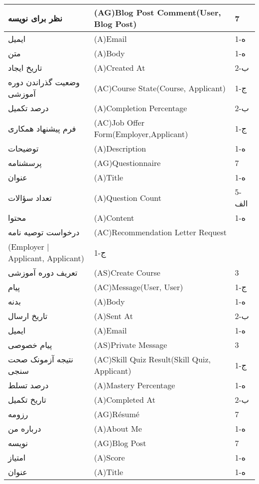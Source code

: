 \documentclass[12pt]{article}
\begin{document}
\begin{longtable}{|l|l|l|}
		\hline
		نظر برای نویسه & (AG)Blog Post Comment(User, Blog Post) & 7     \\
		\hline
		ایمیل & (A)Email & 1-ه   \\
		\hline
		متن & (A)Body & 1-ه   \\
		\hline
		تاریخ ایجاد & (A)Created At & 2-ب   \\
		\hline
		وضعیت گذراندن دوره آموزشی & (AC)Course State(Course, Applicant) & 1-ج   \\
		\hline
		درصد تکمیل & (A)Completion Percentage & 2-ب   \\
		\hline
		فرم پیشنهاد همکاری & (AC)Job Offer Form(Employer,Applicant) & 1-ج   \\
		\hline
		توضیحات & (A)Description & 1-ه   \\
		\hline
		پرسشنامه & (AG)Questionnaire & 7     \\
		\hline
		عنوان & (A)Title & 1-ه   \\
		\hline
		تعداد سؤالات & (A)Question Count & 5-الف \\
		\hline
		محتوا & (A)Content & 1-ه   \\
		\hline
		درخواست توصیه نامه & (AC)Recommendation Letter Request\\ (Employer | Applicant, Applicant) & 1-ج   \\
		\hline
		تعریف دوره آموزشی & (AS)Create Course & 3     \\
		\hline
		پیام & (AC)Message(User, User) & 1-ج   \\
		\hline
		بدنه & (A)Body & 1-ه   \\
		\hline
		تاریخ ارسال & (A)Sent At & 2-ب   \\
		\hline
		ایمیل & (A)Email & 1-ه   \\
		\hline
		پیام خصوصی & (AS)Private Message & 3     \\
		\hline
		نتیجه آزمونک صحت سنجی & (AC)Skill Quiz Result(Skill Quiz, Applicant) & 1-ج   \\
		\hline
		درصد تسلط & (A)Mastery Percentage & 1-ه   \\
		\hline
		تاریخ تکمیل & (A)Completed At & 2-ب   \\
		\hline
		رزومه & (AG)Résumé & 7     \\
		\hline
		درباره من & (A)About Me & 1-ه   \\
		\hline
		نویسه & (AG)Blog Post & 7     \\
		\hline
		امتیاز & (A)Score & 1-ه   \\
		\hline
		عنوان & (A)Title & 1-ه   \\
		\hline

\end{longtable}
\end{document}
